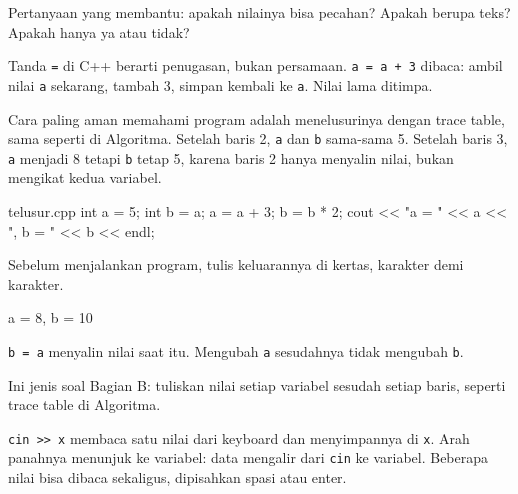 \documentclass[a4paper]{article}
\begin{document}
\par\vspace{4pt}\par\vspace{6pt}
\begin{Penting}[]
Pertanyaan yang membantu: apakah nilainya bisa pecahan? Apakah berupa teks? Apakah hanya ya atau tidak?
\end{Penting}
Tanda \texttt{=} di C++ berarti penugasan, bukan persamaan. \texttt{a = a + 3} dibaca: ambil nilai \texttt{a} sekarang, tambah 3, simpan kembali ke \texttt{a}. Nilai lama ditimpa.

Cara paling aman memahami program adalah menelusurinya dengan trace table, sama seperti di Algoritma. Setelah baris 2, \texttt{a} dan \texttt{b} sama-sama 5. Setelah baris 3, \texttt{a} menjadi 8 tetapi \texttt{b} tetap 5, karena baris 2 hanya menyalin nilai, bukan mengikat kedua variabel.

\begin{MKode}{telusur.cpp}
int a = 5;
int b = a;
a = a + 3;
b = b * 2;
cout << "a = " << a << ", b = " << b << endl;
\end{MKode}
\begin{Tebak}[]
Sebelum menjalankan program, tulis keluarannya di kertas, karakter demi karakter.
\end{Tebak}
\begin{Jawaban}[]
\begin{MKeluaran}[]
a = 8, b = 10
\end{MKeluaran}
\texttt{b = a} menyalin nilai saat itu. Mengubah \texttt{a} sesudahnya tidak mengubah \texttt{b}.
\end{Jawaban}
\begin{Penting}[]
Ini jenis soal Bagian B: tuliskan nilai setiap variabel sesudah setiap baris, seperti trace table di Algoritma.
\end{Penting}
\texttt{cin >> x} membaca satu nilai dari keyboard dan menyimpannya di \texttt{x}. Arah panahnya menunjuk ke variabel: data mengalir dari \texttt{cin} ke variabel. Beberapa nilai bisa dibaca sekaligus, dipisahkan spasi atau enter.
\end{document}
